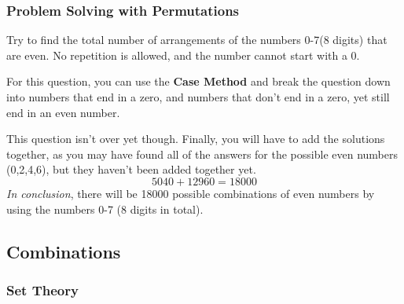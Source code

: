     \clearpage
        \subsubsection{Problem Solving with Permutations}
            \begin{example}
            Try to find the total number of arrangements of the numbers 0-7(8 digits) that are even. No repetition is allowed, and the number cannot start with a 0.
            \end{example}
            For this question, you can use the \textbf{Case Method} and break the question down into numbers that end in a zero, and numbers that don't end in a zero, yet still end in an even number. 
            \begin{parcolumns}{2}
            \colplacechunks
            \end{parcolumns}
            This question isn't over yet though. Finally, you will have to add the solutions together, as you may have found all of the answers for the possible even numbers (0,2,4,6), but they haven't been added together yet.
            $$5040 + 12960 = 18000$$
            \emph{In conclusion}, there will be 18000 possible combinations of even numbers by using the numbers 0-7 (8 digits in total).
            
    \subsection{Combinations}
    
        \subsubsection{Set Theory}
    
